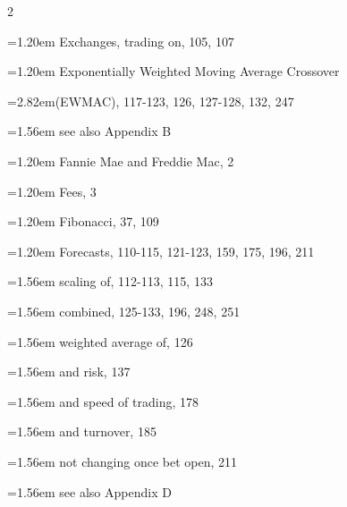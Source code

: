 {\begin{multicols}{2}
\par \noindent\hangindent=1.20em\hspace*{0.00em} Exchanges, trading on, 105, 107
\par \noindent\hangindent=1.20em\hspace*{0.00em} Exponentially Weighted Moving Average Crossover
\par \noindent\hangindent=2.82em\hspace*{1.62em}(EWMAC), 117-123, 126, 127-128, 132, 247
\par \noindent\hangindent=1.56em\hspace*{0.36em} see also Appendix B
\par \noindent\hangindent=1.20em\hspace*{0.00em} Fannie Mae and Freddie Mac, 2
\par \noindent\hangindent=1.20em\hspace*{0.00em} Fees, 3
\par \noindent\hangindent=1.20em\hspace*{0.00em} Fibonacci, 37, 109
\par \noindent\hangindent=1.20em\hspace*{0.00em} Forecasts, 110-115, 121-123, 159, 175, 196, 211
\par \noindent\hangindent=1.56em\hspace*{0.36em} scaling of, 112-113, 115, 133
\par \noindent\hangindent=1.56em\hspace*{0.36em} combined, 125-133, 196, 248, 251
\par \noindent\hangindent=1.56em\hspace*{0.36em} weighted average of, 126
\par \noindent\hangindent=1.56em\hspace*{0.36em} and risk, 137
\par \noindent\hangindent=1.56em\hspace*{0.36em} and speed of trading, 178
\par \noindent\hangindent=1.56em\hspace*{0.36em} and turnover, 185
\par \noindent\hangindent=1.56em\hspace*{0.36em} not changing once bet open, 211
\par \noindent\hangindent=1.56em\hspace*{0.36em} see also Appendix D

\end{multicols}}
